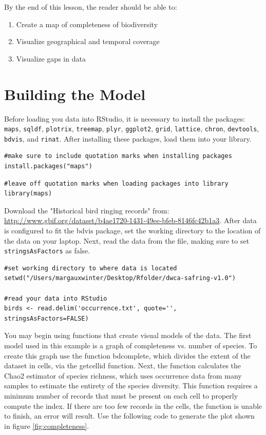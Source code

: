 By the end of this lesson, the reader should be able to:
\begin{enumerate}
\item Create a map of completeness of biodiversity
\item Visualize geographical and temporal coverage
\item Visualize gaps in data
\end{enumerate}

\section{Building the Model}

Before loading you data into RStudio, it is necessary to install the packages: \texttt{maps}, \texttt{sqldf}, \texttt{plotrix}, \texttt{treemap}, \texttt{plyr}, \texttt{ggplot2}, \texttt{grid}, \texttt{lattice}, \texttt{chron}, \texttt{devtools}, \texttt{bdvis}, and \texttt{rinat}.
After installing these packages, load them into your library.

\begin{lstlisting}
#make sure to include quotation marks when installing packages
install.packages("maps")
\end{lstlisting}

\begin{lstlisting}
#leave off quotation marks when loading packages into library
library(maps)
\end{lstlisting}

Download the "Historical bird ringing records" from: \url{http://www.gbif.org/dataset/b4ae1720-1431-49ee-bfeb-8146fc42b1a3}.
After data is configured to fit the bdvis package, set the working directory to the location of the data on your laptop.
Next, read the data from the file, making sure to set \texttt{stringsAsFactors} as false.

\begin{lstlisting}
#set working directory to where data is located
setwd("/Users/margauxwinter/Desktop/Rfolder/dwca-safring-v1.0")

#read your data into RStudio
birds <- read.delim('occurrence.txt', quote='', stringsAsFactors=FALSE)
\end{lstlisting}

You may begin using functions that create visual models of the data.
The first model used in this example is a graph of completeness vs. number of species.
To create this graph use the function bdcomplete, which divides the extent of the dataset in cells, via the getcellid function.
Next, the function calculates the Chao2 estimator of species richness, which uses occurrence data from many samples to estimate the entirety of the species diversity.
This function requires a minimum number of records that must be present on each cell to properly compute the index.
If there are too few records in the cells, the function is unable to finish, an error will result.
Use the following code to generate the plot shown in figure \ref{fig:completeness}.

